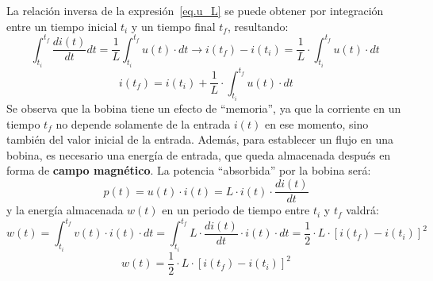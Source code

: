 	La relación inversa de la expresión~\eqref{eq.u_L} se puede obtener por integración entre un tiempo inicial $t_i$ y un tiempo final $t_f$, resultando:
	\begin{equation*}
		\int_{t_i}^{t_f} \dfrac{di(t)}{dt}dt=\dfrac{1}{L}\int_{t_i}^{t_f}u(t)\cdot dt \rightarrow i(t_f)-i(t_i)=\dfrac{1}{L}\cdot\int_{t_i}^{t_f} u(t)\cdot dt\,
	\end{equation*}
	\begin{equation}
		\boxed{i(t_f)=i(t_i)+\dfrac{1}{L}\cdot\int_{t_i}^{t_f} u(t)\cdot dt}
	\end{equation}
	Se observa que la bobina tiene un efecto de ``memoria'', ya que la corriente en un tiempo $t_f$ no depende solamente de la entrada $i(t)$ en ese momento, sino también del valor inicial de la entrada. Además, para establecer un flujo en una bobina, es necesario una energía de entrada, que queda almacenada después en forma de \textbf{campo magnético}. La potencia ``absorbida'' por la bobina será:
	\begin{equation*}
		p(t)=u(t)\cdot i(t)=L\cdot i(t)\cdot\dfrac{di(t)}{dt}
	\end{equation*}
	y la energía almacenada $w(t)$ en un periodo de tiempo entre $t_i$ y $t_f$ valdrá:
	\begin{equation*}
		w(t)=\int_{t_i}^{t_f}v(t)\cdot i(t)\cdot dt=\int_{t_i}^{t_f}L\cdot\dfrac{di(t)}{dt}\cdot i(t)\cdot dt=\dfrac{1}{2}\cdot L\cdot [i(t_f)-i(t_i)]^2
	\end{equation*}
	\begin{equation}
		\boxed{w(t)=\dfrac{1}{2}\cdot L\cdot [i(t_f)-i(t_i)]^2}
	\end{equation}
	
